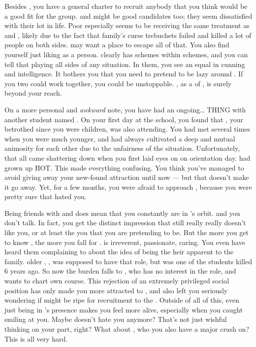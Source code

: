 \documentclass[char]{GL2020}
\begin{document}
 Besides \cAmbition{}, you have a general charter to recruit anybody that you think would be a good fit for the group. \cAdopted{} and \cLibAssist{} might be good candidates too; they seem dissatisfied with their lot in life. Poor \cLibAssist{} especially seems to be receiving the same treatment as \cWarlordDaughter{} and \cTechStar{}, likely due to the fact that \cLibAssist{\their} family’s curse trebuchets failed and killed a lot of people on both sides. \cLibAssist{\They} may want a place to escape all of that. You also find yourself just liking \cLibAssist{\them} as a person. \cLibAssist{} clearly has schemes within schemes, and you can tell that \cLibAssist{\theyare} playing all sides of any situation.  In them, you see an equal in cunning and intelligence.  It bothers you that you need to pretend to be lazy around \cLibAssist{\them}.  If you two could work together, you could be unstoppable.  \cDisney{}, as a \cDisney{\cleric} of \cFarmGod{}, is surely beyond your reach.  
 
On a more personal and \emph{awkward} note, you have had an ongoing\ldots{} THING with another student named \cHeir{\full}. On your first day at the school, you found that \cHeir{}, your betrothed since you were children, was also attending. You had met several times when you were much younger, and had always cultivated a deep and mutual animosity for each other due to the unfairness of the situation. Unfortunately, that all came shattering down when you first laid eyes on \cHeir{\them} on orientation day. \cHeir{} had grown up HOT.  This made everything confusing.  You think you've managed to avoid giving away your new-found attraction until now — but that doesn't make it go away. Yet, for a few months, you were afraid to approach \cHeir{\them}, because you were pretty sure that \cHeir{\they} hated you.  

Being friends with \cAmbition{} and \cPresident{} does mean that you constantly are in \cHeir{}’s orbit.  \cHeir{} and you don’t talk.  In fact, you get the distinct impression that \cHeir{} still really really doesn’t like you, or at least the you that you are pretending to be. But the more you get to know \cHeir{\them}, the more you fall for \cHeir{\them}.  \cHeir{} is irreverent, passionate, caring. You even have heard them complaining to \cAmbition{} about the idea of being the heir apparent to the \cHeir{\formal} family. \cHeir{\Their} older \cHeirSibling{\sibling}, \cHeirSibling{}, was supposed to have that role, but \cHeirSibling{} was one of the students killed 6 years ago. So now the burden falls to \cHeir{}, who has no interest in the role, and wants to chart \cHeir{\their} own course. This rejection of an extremely privileged social position has only made you more attracted to \cHeir{\them}, and also left you seriously wondering if \cHeir{\they} might be ripe for recruitment to the \pGoaties{}.  Outside of all of this, even just being in \cHeir{}'s presence makes you feel more alive, especially when you caught \cHeir{\them} smiling at you. Maybe \cHeir{} doesn’t hate you anymore?  That’s not just wishful thinking on your part, right? What about \cPresident{}, who you also have a major crush on?  This is all very hard. 
\end{document}
